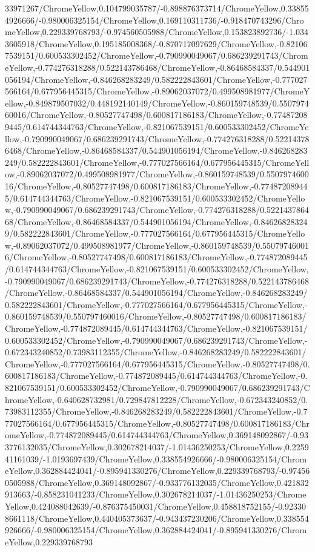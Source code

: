{\begin{tikzternal}
{33971267/ChromeYellow,0.104799035787/-0.898876373714/ChromeYellow,0.338554926666/-0.980006325154/ChromeYellow,0.169110311736/-0.918470743296/ChromeYellow,0.229339768793/-0.974560505988/ChromeYellow,0.153823892736/-1.0343605918/ChromeYellow,0.195185008368/-0.870717097629/ChromeYellow,-0.821067539151/0.600533302452/ChromeYellow,-0.790990049067/0.686239291743/ChromeYellow,-0.774276318288/0.522143786468/ChromeYellow,-0.86468584337/0.544901056194/ChromeYellow,-0.846268283249/0.582222843601/ChromeYellow,-0.777027566164/0.677956445315/ChromeYellow,-0.89062037072/0.499508981977/ChromeYellow,-0.849879507032/0.448192140149/ChromeYellow,-0.860159748539/0.550797460016/ChromeYellow,-0.80527747498/0.600817186183/ChromeYellow,-0.774872089445/0.614744344763/ChromeYellow,-0.821067539151/0.600533302452/ChromeYellow,-0.790990049067/0.686239291743/ChromeYellow,-0.774276318288/0.522143786468/ChromeYellow,-0.86468584337/0.544901056194/ChromeYellow,-0.846268283249/0.582222843601/ChromeYellow,-0.777027566164/0.677956445315/ChromeYellow,-0.89062037072/0.499508981977/ChromeYellow,-0.860159748539/0.550797460016/ChromeYellow,-0.80527747498/0.600817186183/ChromeYellow,-0.774872089445/0.614744344763/ChromeYellow,-0.821067539151/0.600533302452/ChromeYellow,-0.790990049067/0.686239291743/ChromeYellow,-0.774276318288/0.522143786468/ChromeYellow,-0.86468584337/0.544901056194/ChromeYellow,-0.846268283249/0.582222843601/ChromeYellow,-0.777027566164/0.677956445315/ChromeYellow,-0.89062037072/0.499508981977/ChromeYellow,-0.860159748539/0.550797460016/ChromeYellow,-0.80527747498/0.600817186183/ChromeYellow,-0.774872089445/0.614744344763/ChromeYellow,-0.821067539151/0.600533302452/ChromeYellow,-0.790990049067/0.686239291743/ChromeYellow,-0.774276318288/0.522143786468/ChromeYellow,-0.86468584337/0.544901056194/ChromeYellow,-0.846268283249/0.582222843601/ChromeYellow,-0.777027566164/0.677956445315/ChromeYellow,-0.860159748539/0.550797460016/ChromeYellow,-0.80527747498/0.600817186183/ChromeYellow,-0.774872089445/0.614744344763/ChromeYellow,-0.821067539151/0.600533302452/ChromeYellow,-0.790990049067/0.686239291743/ChromeYellow,-0.672343240852/0.73983112355/ChromeYellow,-0.846268283249/0.582222843601/ChromeYellow,-0.777027566164/0.677956445315/ChromeYellow,-0.80527747498/0.600817186183/ChromeYellow,-0.774872089445/0.614744344763/ChromeYellow,-0.821067539151/0.600533302452/ChromeYellow,-0.790990049067/0.686239291743/ChromeYellow,-0.640628732981/0.729847812228/ChromeYellow,-0.672343240852/0.73983112355/ChromeYellow,-0.846268283249/0.582222843601/ChromeYellow,-0.777027566164/0.677956445315/ChromeYellow,-0.80527747498/0.600817186183/ChromeYellow,-0.774872089445/0.614744344763/ChromeYellow,0.369148092867/-0.933776132035/ChromeYellow,0.302678214037/-1.01436250253/ChromeYellow,0.225941161039/-1.0193697439/ChromeYellow,0.338554926666/-0.980006325154/ChromeYellow,0.362884424041/-0.895941330276/ChromeYellow,0.229339768793/-0.974560505988/ChromeYellow,0.369148092867/-0.933776132035/ChromeYellow,0.421832913663/-0.858231041233/ChromeYellow,0.302678214037/-1.01436250253/ChromeYellow,0.424088042639/-0.876375450031/ChromeYellow,0.458818752155/-0.923308661118/ChromeYellow,0.440405373637/-0.943437230206/ChromeYellow,0.338554926666/-0.980006325154/ChromeYellow,0.362884424041/-0.895941330276/ChromeYellow,0.229339768793}
\end{tikzternal}}
